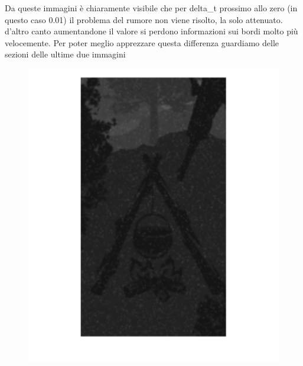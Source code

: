 Da queste immagini è chiaramente visibile che per delta\_t prossimo allo zero (in questo caso 0.01) il problema del rumore non viene risolto, la solo attenuato. d'altro canto aumentandone il valore si perdono informazioni sui bordi molto più velocemente. Per poter meglio apprezzare questa differenza guardiamo delle sezioni delle ultime due immagini\\

\begin{figure}[htb] \centering
\includegraphics[scale=0.15]{Pictures/Esempi di utilizzo/Esempio 3/Dettaglio_SfondoForesta_filtrata_deltat0_1.png}

\end{figure}
